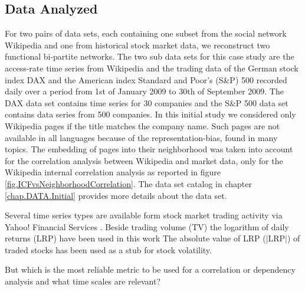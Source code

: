 \documentclass[a4paper,10pt]{scrbook}
\begin{document}
\subsection{Data Analyzed}
For two pairs of data sets, each containing one subset from the social network Wikipedia and one from historical stock market data, we reconstruct two functional bi-partite networks. The two sub data sets for this case study are the access-rate time series from Wikipedia and the trading data of the German stock index DAX and the American index Standard and Poor's (S\&P) 500 recorded daily over a period from 1st of January 2009 to 30th of September 2009. The DAX data set contains time series for 30 companies and the S\&P 500 data set contains data series from 500 companies. In this initial study we considered only Wikipedia pages if the title matches the company name. Such pages are not available in all languages because of the representation-bias, found in many topics. The embedding of pages into their neighborhood was taken into account for the correlation analysis between Wikipedia and market data, only for the Wikipedia internal correlation analysis as reported in figure \ref{fig.ICFvsNeighborhoodCorrelation}.
The data set catalog in chapter \ref{chap.DATA.Initial} provides more details about the data set.

Several time series types are available form stock market trading activity via Yahoo! Financial Services \cite{Yahoo.Financial.Services}. Beside trading volume (TV) the logarithm of daily returns (LRP) have been used in this work The absolute value of LRP ($\vert \textrm{LRP} \vert$) of traded stocks has been used as a stub for stock volatility.

But which is the most reliable metric to be used for a correlation or dependency analysis and what time scales are relevant? 
\end{document}
